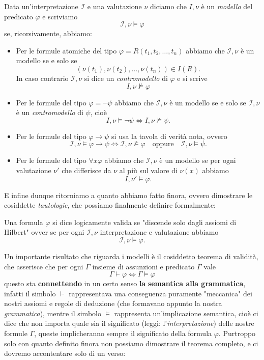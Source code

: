 \documentclass[11pt]{scrartcl}
\begin{document}
	\begin{definition}
		Data un'interpretazione $\mathcal{I}$ e una valutazione $\nu$ diciamo che $I,\nu$ è un \textit{modello} del predicato $\varphi$ e scriviamo
		$$\mathcal{I},\nu \models \varphi$$
		se, ricorsivamente, abbiamo:
		\begin{itemize}
			\item Per le formule atomiche del tipo $\varphi=R(t_1,t_2,\dots,t_n)$ abbiamo che $\mathcal{I},\nu$ è un modello se e solo se
			$$\left(\nu(t_1),\nu(t_2),\dots,\nu(t_n)\right)\in I(R).$$
			In caso contrario $\mathcal{I},\nu$ si dice un \textit{contromodello} di $\varphi$ e si scrive
			$$I,\nu\not\models \varphi$$
			\item Per le formule del tipo $\varphi=\lnot\psi$ abbiamo che $\mathcal{I},\nu$ è un modello se e solo se $\mathcal{I},\nu$ è un \textit{contromodello} di $\psi$, cioè
			$$I,\nu \models \lnot\psi \iff I,\nu \not\models \psi.$$
			\item Per le formule del tipo $\varphi\to \psi$ si usa la tavola di verità nota, ovvero
			$$\mathcal{I},\nu \models \varphi\to\psi \iff \mathcal{I},\nu \not\models \varphi \quad\text{oppure}\quad \mathcal{I},\nu\models \psi.$$
			\item Per le formule del tipo $\forall x \varphi$ abbiamo che $\mathcal{I},\nu$ è un modello se per ogni valutazione $\nu'$ che differisce da $\nu$ al più sul valore di $\nu(x)$ abbiamo 
			$$I,\nu'\models \varphi.$$
		\end{itemize}
	\end{definition}
	E infine dunque ritorniamo a quanto abbiamo fatto finora, ovvero dimostrare le cosiddette \textit{tautologie}, che possiamo finalmente definire formalmente:
	\begin{definition}
		Una formula $\varphi$ si dice logicamente valida se "discende solo dagli assiomi di Hilbert" ovver se per ogni $\mathcal{I},\nu$ interpretazione e valutazione abbiamo
		$$\mathcal{I},\nu\models \varphi.$$
	\end{definition}
	Un importante risultato che riguarda i modelli è il cosiddetto teorema di validità, che asserisce che per ogni $\Gamma$ insieme di assunzioni e predicato $\Gamma$ vale
	$$\Gamma\vdash \varphi \iff \Gamma \models \varphi$$
	questo sta \textbf{connettendo} in un certo senso \textbf{la} \textbf{semantica alla grammatica}, infatti il simbolo $\vdash$ rappresentava una conseguenza puramente "meccanica" dei nostri assiomi e regole di deduzione (che formavano appunto la nostra \textit{grammatica}), mentre il simbolo $\models$ rappresenta un'implicazione semantica, cioè ci dice che non importa quale sia il significato (leggi: l'\textit{interpretazione}) delle nostre formule $\Gamma$, queste implicheranno sempre il significato della formula $\varphi$. Purtroppo solo con quanto definito finora non possiamo dimostrare il teorema completo, e ci dovremo accontentare solo di un verso:
\end{document}
